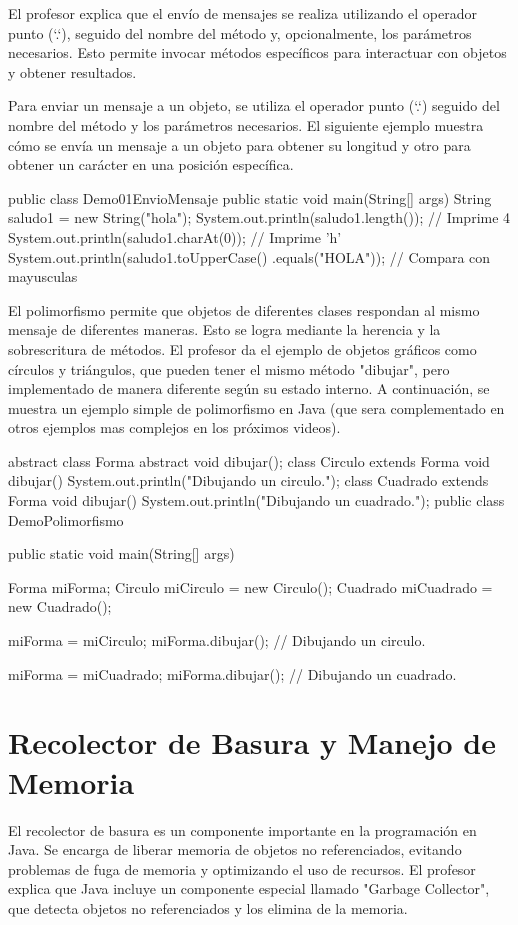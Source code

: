\documentclass[a4paper]{report}
\begin{document}
El profesor explica que el envío de mensajes se realiza utilizando el operador punto (`.`), seguido del nombre del método y, opcionalmente, los parámetros necesarios. Esto permite invocar métodos específicos para interactuar con objetos y obtener resultados.

Para enviar un mensaje a un objeto, se utiliza el operador punto (`.`) seguido del nombre del método y los parámetros necesarios. El siguiente ejemplo muestra cómo se envía un mensaje a un objeto para obtener su longitud y otro para obtener un carácter en una posición específica.

\begin{roundedlst}
public class Demo01EnvioMensaje {
    public static void main(String[] args) {
      String saludo1 = new String("hola");
      System.out.println(saludo1.length()); 
      // Imprime 4
      System.out.println(saludo1.charAt(0)); 
      // Imprime 'h'
      System.out.println(saludo1.toUpperCase()
                         .equals("HOLA")); 
      // Compara con mayusculas
    }
}
\end{roundedlst}

El polimorfismo permite que objetos de diferentes clases respondan al mismo mensaje de diferentes maneras. Esto se logra mediante la herencia y la sobrescritura de métodos. El profesor da el ejemplo de objetos gráficos como círculos y triángulos, que pueden tener el mismo método "dibujar", pero implementado de manera diferente según su estado interno. A continuación, se muestra un ejemplo simple de polimorfismo en Java (que sera complementado en otros ejemplos mas complejos en los próximos videos).

\begin{roundedlst}
abstract class Forma {
    abstract void dibujar();
}  
class Circulo extends Forma {
    void dibujar() {
        System.out.println("Dibujando un circulo.");
    }
}
class Cuadrado extends Forma {
    void dibujar() {
        System.out.println("Dibujando un cuadrado.");
    }
} 
public class DemoPolimorfismo {
    public static void main(String[] args) {
        Forma miForma;
        Circulo miCirculo = new Circulo();
        Cuadrado miCuadrado = new Cuadrado();

        miForma = miCirculo;
        miForma.dibujar();  // Dibujando un circulo.

        miForma = miCuadrado;
        miForma.dibujar();  // Dibujando un cuadrado.
    }
}
\end{roundedlst}


\section{Recolector de Basura y Manejo de Memoria}
El recolector de basura es un componente importante en la programación en Java. Se encarga de liberar memoria de objetos no referenciados, evitando problemas de fuga de memoria y optimizando el uso de recursos. El profesor explica que Java incluye un componente especial llamado "Garbage Collector", que detecta objetos no referenciados y los elimina de la memoria.
\end{document}
